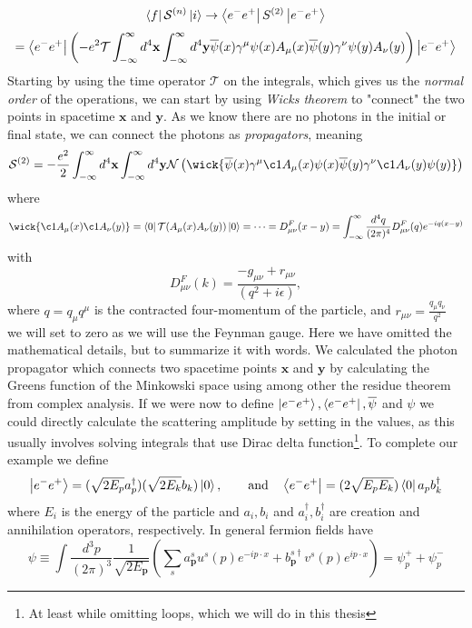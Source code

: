 \documentclass[12pt, a4paper]{book}
\begin{document}
$$
\bra{f}\mathcal{S}^{(n)}\ket{i} \rightarrow \bra{e^-e^+}S^{(2)}\ket{e^-e^+} 
$$
$$
= \bra{e^-e^+}\left(-e^2\mathcal{T}\int_{-\infty}^{\infty}d^4\mathbf{x} \int_{-\infty}^{\infty}d^4\mathbf{y} \overline{\psi}(x)\gamma^\mu\psi(x)A_\mu(x)\overline{\psi}(y)\gamma^\nu\psi(y)A_\nu(y) \right)\ket{e^-e^+}
$$
Starting by using the time operator $\mathcal{T}$ on the integrals, which gives us the \textit{normal order} of the operations, we can start by using \textit{Wicks theorem} to "connect" the two points in spacetime $\mathbf{x}$ and $\mathbf{y}$. As we know there are no photons in the initial or final state, we can connect the photons as \textit{propagators}, meaning
$$
\mathcal{S}^{(2)} = -\frac{e^2}{2}\int_{-\infty}^{\infty}d^4\mathbf{x} \int_{-\infty}^{\infty}d^4\mathbf{y} \mathcal{N} \left(\wick{\overline{\psi}(x)\gamma^\mu\c1A_\mu(x)\psi(x)\overline{\psi}(y)\gamma^\nu\c1A_\nu(y)\psi(y)}\right)
$$
where 
$$
\wick{\c1A_\mu(x)\c1A_\nu(y)} = \bra{0}\mathcal{T}(A_\mu(x)A_\nu(y))\ket{0} = \cdots = D_{\mu\nu}^F(x-y) = \int_{-\infty}^{\infty}\frac{d^4q}{(2\pi)^4}D_{\mu\nu}^F(q)e^{-iq(x-y)}
$$
with
\begin{equation}\label{eq:p-prop}
    D_{\mu\nu}^F(k) = \frac{-g_{\mu\nu}+r_{\mu\nu}}{(q^2+i\epsilon)},
\end{equation}
where $q = q_\mu q^\mu$ is the contracted four-momentum of the particle, and $r_{\mu\nu}=\frac{q_\mu q_\nu}{q^2}$ we will set to zero as we will use the Feynman gauge. Here we have omitted the mathematical details, but to summarize it with words. We calculated the photon propagator which connects two spacetime points $\mathbf{x}$ and $\mathbf{y}$ by calculating the Greens function of the Minkowski space using among other the residue theorem from complex analysis. 
If we were now to define $\ket{e^-e^+}, \bra{e^-e^+}, \overline{\psi}$ and $\psi$ we could directly calculate the scattering amplitude by setting in the values, as this usually involves solving integrals that use Dirac delta function\footnote{At least while omitting loops, which we will do in this thesis}. 
To complete our example we define
$$
\ket{e^-e^+} = (\sqrt{2E_p}a^\dagger_{p})(\sqrt{2E_k}b_{k})\ket{0},\qquad\text{and}\quad \bra{e^-e^+} = (2\sqrt{E_pE_k})\bra{0}a_{p}b^\dagger_{k}
$$
where $E_i$ is the energy of the particle and $a_i,b_i$ and $a^\dagger_i,b^\dagger_i$ are creation and annihilation operators, respectively. In general fermion fields have
$$
\psi \equiv\int\frac{d^3p}{(2\pi)^3}\frac{1}{\sqrt{2E_\mathbf{p}}}\left(\sum_sa^s_\mathbf{p}u^s(p)e^{-ip\cdot x}+b^{s\dagger}_\mathbf{p}v^s(p)e^{ip\cdot x}\right) =\psi^+_p+\psi^-_p
$$
\end{document}
